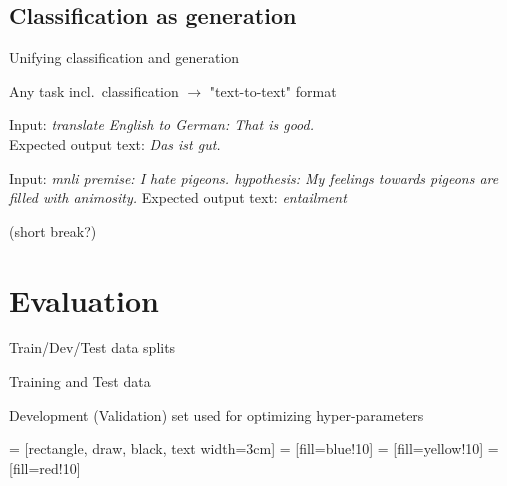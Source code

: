 \documentclass[12pt,aspectratio=169,handout]{beamer}
\begin{document}
\subsection{Classification as generation}

\begin{frame}{Unifying classification and generation}

Any task incl.\ classification $\to$ "text-to-text" format

\begin{example}[Translation En-De]
Input: \emph{translate English to German: That is good.} \\
Expected output text: \emph{Das ist gut.}
\end{example}

\begin{example}[MNLI]
Input: \emph{mnli premise: I hate pigeons. hypothesis: My feelings towards pigeons are filled with animosity.}
Expected output text: \emph{entailment}
\end{example}


\end{frame}

\begin{frame}
	(short break?)
\end{frame}


\section{Evaluation}


\begin{frame}{ Train/Dev/Test data splits}

Training and Test data

Development (Validation) set used for optimizing hyper-parameters

 = [rectangle, draw, black, text width=3cm]
 = [fill=blue!10]
 = [fill=yellow!10]
 = [fill=red!10]

\begin{figure}


\end{figure}

\end{frame}
\end{document}
